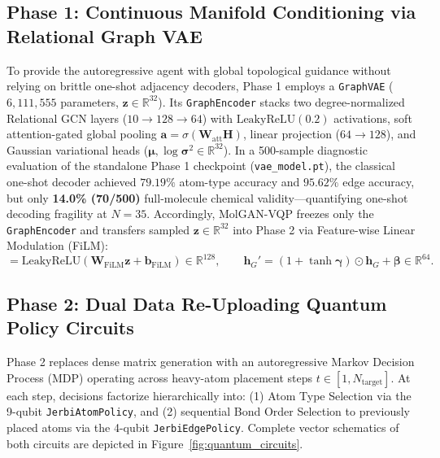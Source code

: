 \documentclass[10pt,a4paper]{article}
\begin{document}
\subsection{Phase 1: Continuous Manifold Conditioning via Relational Graph VAE}
To provide the autoregressive agent with global topological guidance without relying on brittle one-shot adjacency decoders, Phase 1 employs a \texttt{GraphVAE} ($6,111,555$ parameters, $\mathbf{z} \in \mathbb{R}^{32}$). Its \texttt{GraphEncoder} stacks two degree-normalized Relational GCN layers ($10 \to 128 \to 64$) with $\text{LeakyReLU}(0.2)$ activations, soft attention-gated global pooling $\mathbf{a} = \sigma(\mathbf{W}_{\text{att}}\mathbf{H})$, linear projection ($64 \to 128$), and Gaussian variational heads ($\boldsymbol{\mu}, \log\boldsymbol{\sigma}^2 \in \mathbb{R}^{32}$). In a 500-sample diagnostic evaluation of the standalone Phase 1 checkpoint (\texttt{vae\_model.pt}), the classical one-shot decoder achieved $79.19\%$ atom-type accuracy and $95.62\%$ edge accuracy, but only \textbf{14.0\% (70/500)} full-molecule chemical validity---quantifying one-shot decoding fragility at $N=35$. Accordingly, MolGAN-VQP freezes only the \texttt{GraphEncoder} and transfers sampled $\mathbf{z} \in \mathbb{R}^{32}$ into Phase 2 via Feature-wise Linear Modulation (FiLM):
\begin{equation}
[\boldsymbol{\gamma} \,\|\, \boldsymbol{\beta}] = \mathrm{LeakyReLU}(\mathbf{W}_{\text{FiLM}}\mathbf{z} + \mathbf{b}_{\text{FiLM}}) \in \mathbb{R}^{128}, \qquad \mathbf{h}_G' = (1 + \tanh\boldsymbol{\gamma}) \odot \mathbf{h}_G + \boldsymbol{\beta} \in \mathbb{R}^{64}.
\end{equation}

\subsection{Phase 2: Dual Data Re-Uploading Quantum Policy Circuits}
Phase 2 replaces dense matrix generation with an autoregressive Markov Decision Process (MDP) operating across heavy-atom placement steps $t \in [1, N_{\text{target}}]$. At each step, decisions factorize hierarchically into: (1) Atom Type Selection via the 9-qubit \texttt{JerbiAtomPolicy}, and (2) sequential Bond Order Selection to previously placed atoms via the 4-qubit \texttt{JerbiEdgePolicy}. Complete vector schematics of both circuits are depicted in Figure~\ref{fig:quantum_circuits}.
\end{document}

